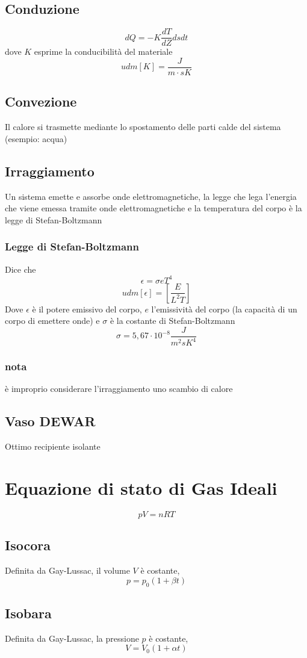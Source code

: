 \documentclass[a4paper]{report}
\begin{document}
  \subsection{Conduzione}
  $$ dQ = -K \frac{dT}{dZ} ds dt $$
  dove $K$ esprime la conducibilità del materiale
  $$ udm[K] = \frac{J}{m\cdot sK} $$
  \subsection{Convezione}
  Il calore si trasmette mediante lo spostamento delle parti calde del sistema (esempio: acqua)
  \subsection{Irraggiamento}
  Un sistema emette e assorbe onde elettromagnetiche, la legge che lega l'energia che viene emessa tramite onde elettromagnetiche e la temperatura del corpo è la legge di Stefan-Boltzmann
  \subsubsection{Legge di Stefan-Boltzmann}
  Dice che
  $$\epsilon = \sigma e T^4$$
  $$ udm[\epsilon] = [\frac{E}{L^2T}] $$
  Dove $\epsilon$ è il potere emissivo del corpo, $e$ l'emissività del corpo (la capacità di un corpo di emettere onde) e $\sigma$ è la costante di Stefan-Boltzmann
  $$ \sigma = 5,67 \cdot 10^{-8} \frac{J}{m^2sK^4} $$
  \subsubsection{nota}
  è improprio considerare l'irraggiamento uno scambio di calore
  \subsection{Vaso DEWAR}
  Ottimo recipiente isolante

  \section{Equazione di stato di Gas Ideali}
  $$ pV = nRT $$
  \subsection{Isocora}
  Definita da Gay-Lussac, il volume $V$ è costante,
  $$ p = p_0(1 + \beta t) $$
  \subsection{Isobara}
  Definita da Gay-Lussac, la pressione $p$ è costante,
  $$ V = V_0(1 + \alpha t) $$
\end{document}
